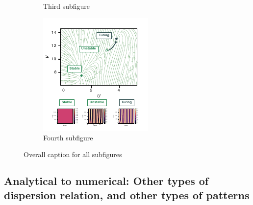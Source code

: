 \begin{figure}[H]
\begin{subfigure}{.5\linewidth}
            \caption{Third subfigure}
        \end{subfigure}%
        \begin{subfigure}{.5\linewidth}
            \centering
            \includegraphics[width=\linewidth]{chapters/Chapter 1/multistability1}
            \caption{Fourth subfigure}
        \end{subfigure}
        \caption{Overall caption for all subfigures}
\end{figure}

%
%
%


\subsection{Analytical to numerical: Other types of dispersion relation, and other types of patterns}

